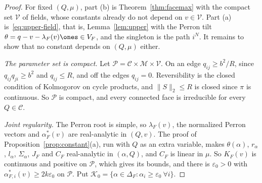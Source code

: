 \begin{proof}
For fixed $(Q,\mu)$, part (b) is Theorem~\ref{thm:facemax} with the compact
set $\mathcal V$ of fields, whose constants already do not depend on
$v\in\mathcal V$. Part (a) is~\eqref{eq:upper-field}, that is, Lemma~\ref{lem:upper}
with the Perron tilt $\theta=q-v-\lambda_F(v)\ones\in V_F$, and the singleton is
the path $i^N$. It remains to show that no constant depends on $(Q,\mu)$ either.

\emph{The parameter set is compact.} Let $\mathcal P=\mathcal C\times\mathcal M\times\mathcal V$.
On an edge $q_{ij}\ge b^2/R$, since $q_{ij}q_{ji}\ge b^2$ and $q_{ij}\le R$, and off the
edges $q_{ij}=0$. Reversibility is the closed condition of Kolmogorov on cycle products,
and $\|S\|_2\le R$ is closed since $\pi$ is continuous. So $\mathcal P$ is compact, and
every connected face is irreducible for every $Q\in\mathcal C$.

\emph{Joint regularity.} The Perron root is simple, so $\lambda_F(v)$, the normalized
Perron vectors and $\alpha^*_F(v)$ are real-analytic in $(Q,v)$. The proof of
Proposition~\ref{prop:constant}(a), run with $Q$ as an extra variable, makes
$\theta(\alpha)$, $r_\alpha$, $l_\alpha$, $\Sigma_\alpha$, $J_F$ and $C_F$ real-analytic in
$(\alpha,Q)$, and $C_F$ is linear in $\mu$. So $K_F(v)$ is continuous and positive on
$\mathcal P$, which gives its bounds, and there is $\varepsilon_0>0$ with
$\alpha^*_{F,i}(v)\ge2k\varepsilon_0$ on $\mathcal P$. Put
$\mathcal K_0=\{\alpha\in\Delta_F:\alpha_i\ge\varepsilon_0\ \forall i\}$.


\end{proof}
